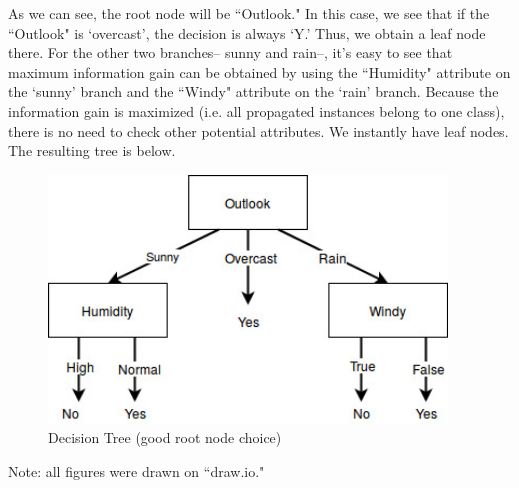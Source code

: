 \documentclass[12pt]{article}
\begin{document}
	As we can see, the root node will be ``Outlook." In this case, we see that if the ``Outlook" is `overcast', the decision is always `Y.' Thus, we obtain a leaf node there. For the other two branches-- sunny and rain--, it's easy to see that maximum information gain can be obtained by using the ``Humidity" attribute on the `sunny' branch and the ``Windy" attribute on the `rain' branch. Because the information gain is maximized (i.e. all propagated instances belong to one class), there is no need to check other potential attributes. We instantly have leaf nodes. The resulting tree is below.
	\begin{figure}[H]
		\begin{center}
			\includegraphics[width=300pt]{hw3_ml_tree2.jpg}
			\caption{Decision Tree (good root node choice)}
			\label{fig:tree2}
		\end{center}
	\end{figure}
	Note: all figures were drawn on ``draw.io."
	
\end{document}
